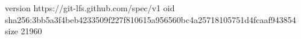version https://git-lfs.github.com/spec/v1
oid sha256:3bb5a3f4beb4233509f227f810615a956560bc4a25718105751d4fcaaf943854
size 21960
